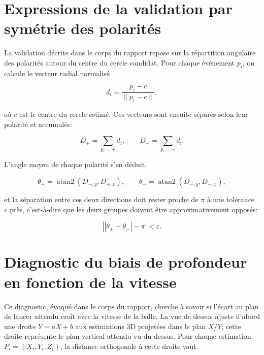 \documentclass[a4paper,11pt]{report}
\begin{document}
\section*{Expressions de la validation par symétrie des polarités}

La validation décrite dans le corps du rapport repose sur la répartition angulaire des polarités autour du centre du cercle candidat. Pour chaque événement \(p_i\), on calcule le vecteur radial normalisé

\begin{equation}
d_i = \frac{p_i - c}{\|p_i - c\|},
\label{eq:direction-radiale}
\end{equation}

où \(c\) est le centre du cercle estimé. Ces vecteurs sont ensuite séparés selon leur polarité et accumulés:

\begin{equation}
D_+ = \sum_{p_i = +} d_i,
\qquad
D_- = \sum_{p_i = -} d_i.
\label{eq:sommes-polarites}
\end{equation}

L'angle moyen de chaque polarité s'en déduit,

\begin{equation}
\theta_+ = \operatorname{atan2}(D_{+,y}, D_{+,x}),
\qquad
\theta_- = \operatorname{atan2}(D_{-,y}, D_{-,x}),
\label{eq:angles-moyens}
\end{equation}

et la séparation entre ces deux directions doit rester proche de \(\pi\) à une tolérance \(\varepsilon\) près, c'est-à-dire que les deux groupes doivent être approximativement opposés:

\begin{equation}
\left||\theta_+ - \theta_-| - \pi\right| < \varepsilon.
\label{eq:critere-opposition}
\end{equation}

\section*{Diagnostic du biais de profondeur en fonction de la vitesse}

Ce diagnostic, évoqué dans le corps du rapport, cherche à savoir si l'écart au plan de lancer attendu croît avec la vitesse de la balle. La vue de dessus ajuste d'abord une droite \(Y = aX + b\) aux estimations 3D projetées dans le plan \(X/Y\); cette droite représente le plan vertical attendu vu du dessus. Pour chaque estimation \(P_i = (X_i,Y_i,Z_i)\), la distance orthogonale à cette droite vaut
\end{document}
